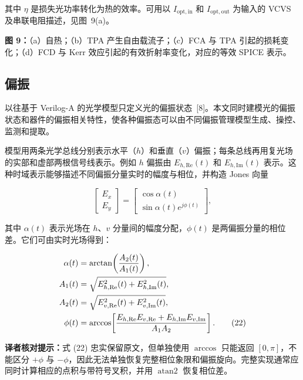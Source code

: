 \documentclass[11pt,a4paper]{ctexart}
\newcommand{\transnote}[1]{%
  \par\noindent\colorbox{yellow!16}{%
    \parbox{\dimexpr\linewidth-2\fboxsep}{\textbf{译者核对提示：}#1}}\par}
\begin{document}
其中 $\eta$ 是损失光功率转化为热的效率。可用以 $I_{\mathrm{opt,in}}$ 和 $I_{\mathrm{opt,out}}$ 为输入的 VCVS 及串联电阻描述，见图~9(a)。

\noindent\textbf{图 9：}（a）自热；（b）TPA 产生自由载流子；（c）FCA 与 TPA 引起的损耗变化；（d）FCD 与 Kerr 效应引起的有效折射率变化，对应的等效 SPICE 表示。

\subsection{偏振}

以往基于 Verilog-A 的光学模型只定义光的偏振状态~[8]。本文同时建模光的偏振状态和器件的偏振相关特性，使各种偏振态可以由不同偏振管理模型生成、操控、监测和提取。

模型用两条光学总线分别表示水平（$h$）和垂直（$v$）偏振；每条总线再用复光场的实部和虚部两根信号线表示。例如 $h$ 偏振由 $E_{h,\mathrm{Re}}(t)$ 和 $E_{h,\mathrm{Im}}(t)$ 表示。这种时域表示能够描述不同偏振分量实时的幅度与相位，并构造 Jones 向量

\begin{equation}
\begin{bmatrix}E_x\\E_y\end{bmatrix}
=\begin{bmatrix}\cos\alpha(t)\\\sin\alpha(t)e^{j\phi(t)}\end{bmatrix},
\tag{21}
\end{equation}

其中 $\alpha(t)$ 表示光场在 $h$、$v$ 分量间的幅度分配，$\phi(t)$ 是两偏振分量的相位差。它们可由实时光场得到：

\begin{align}
\alpha(t)&=\arctan\!\left(\frac{A_2(t)}{A_1(t)}\right),\notag\\
A_1(t)&=\sqrt{E_{h,\mathrm{Re}}^2(t)+E_{h,\mathrm{Im}}^2(t)},\notag\\
A_2(t)&=\sqrt{E_{v,\mathrm{Re}}^2(t)+E_{v,\mathrm{Im}}^2(t)},\notag\\
\phi(t)&=\arccos\!\left[
\frac{E_{h,\mathrm{Re}}E_{v,\mathrm{Re}}+E_{h,\mathrm{Im}}E_{v,\mathrm{Im}}}{A_1A_2}
\right].
\tag{22}
\end{align}

\transnote{式 (22) 忠实保留原文，但单独使用 $\arccos$ 只能返回 $[0,\pi]$，不能区分 $+\phi$ 与 $-\phi$，因此无法单独恢复完整相位象限和偏振旋向。完整实现通常应同时计算相应的点积与带符号叉积，并用 $\operatorname{atan2}$ 恢复相位差。}
\end{document}
